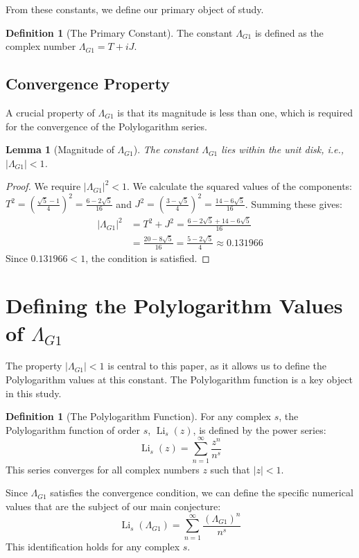 \documentclass{amsart}
\theoremstyle{plain}
\newtheorem{lemma}[theorem]{Lemma}
\theoremstyle{definition}
\newtheorem{definition}[theorem]{Definition}
\theoremstyle{remark}
\DeclareMathOperator{\Li}{Li} %
\newcommand{\LambdaG}{\Lambda_{G1}}
\begin{document}
From these constants, we define our primary object of study.
\begin{definition}[The Primary Constant]
The constant $\LambdaG$ is defined as the complex number $\LambdaG = T+iJ$.
\end{definition}

\subsection{Convergence Property}
A crucial property of $\LambdaG$ is that its magnitude is less than one, which is required for the convergence of the Polylogarithm series.
\begin{lemma}[Magnitude of $\LambdaG$]
\label{lem:convergence}
The constant $\LambdaG$ lies within the unit disk, i.e., $|\LambdaG| < 1$.
\end{lemma}
\begin{proof}
We require $|\LambdaG|^2 < 1$. We calculate the squared values of the components: $T^2 = \left(\frac{\sqrt{5}-1}{4}\right)^2 = \frac{6-2\sqrt{5}}{16}$ and $J^2 = \left(\frac{3-\sqrt{5}}{4}\right)^2 = \frac{14-6\sqrt{5}}{16}$. Summing these gives:
\begin{align*}
    |\LambdaG|^2 &= T^2+J^2 = \frac{6-2\sqrt{5} + 14-6\sqrt{5}}{16} \\
                 &= \frac{20-8\sqrt{5}}{16} = \frac{5-2\sqrt{5}}{4} \approx 0.131966
\end{align*}
Since $0.131966 < 1$, the condition is satisfied.
\qedhere
\end{proof}

\section{Defining the Polylogarithm Values of \texorpdfstring{$\LambdaG$}{Lambda\_G1}}
The property $|\LambdaG| < 1$ is central to this paper, as it allows us to define the Polylogarithm values at this constant. The Polylogarithm function is a key object in this study.
\begin{definition}[The Polylogarithm Function]
For any complex $s$, the Polylogarithm function of order $s$, $\Li_s(z)$, is defined by the power series:
\[ \Li_s(z) = \sum_{n=1}^{\infty} \frac{z^n}{n^s} \]
This series converges for all complex numbers $z$ such that $|z|<1$.
\end{definition}

Since $\LambdaG$ satisfies the convergence condition, we can define the specific numerical values that are the subject of our main conjecture:
\[ \Li_s(\LambdaG) = \sum_{n=1}^{\infty} \frac{(\LambdaG)^{n}}{n^s} \]
This identification holds for any complex $s$.
\end{document}
